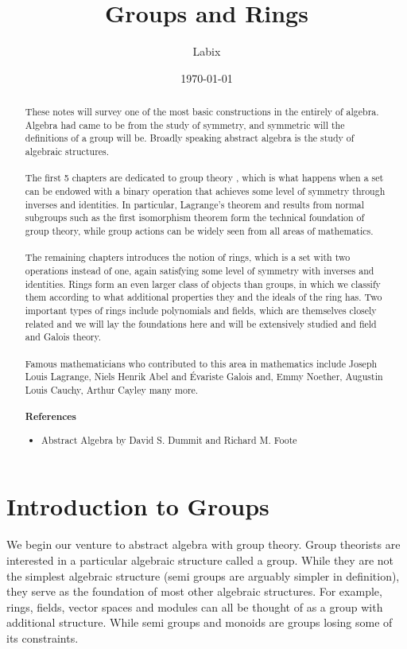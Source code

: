 \documentclass[a4paper]{article}
\title{Groups and Rings}
\author{Labix}
\date{\today}
\begin{document}
\maketitle
\begin{abstract}
These notes will survey one of the most basic constructions in the entirely of algebra. Algebra had came to be from the study of symmetry, and symmetric will the definitions of a group will be. Broadly speaking abstract algebra is the study of algebraic structures. \\~\\

The first 5 chapters are dedicated to group theory , which is what happens when a set can be endowed with a binary operation that achieves some level of symmetry through inverses and identities. In particular, Lagrange's theorem and results from normal subgroups such as the first isomorphism theorem form the technical foundation of group theory, while group actions can be widely seen from all areas of mathematics. \\~\\

The remaining chapters introduces the notion of rings, which is a set with two operations instead of one, again satisfying some level of symmetry with inverses and identities. Rings form an even larger class of objects than groups, in which we classify them according to what additional properties they and the ideals of the ring has. Two important types of rings include polynomials and fields, which are themselves closely related and we will lay the foundations here and will be extensively studied and field and Galois theory. \\~\\

Famous mathematicians who contributed to this area in mathematics include Joseph Louis Lagrange, Niels Henrik Abel and Évariste Galois and, Emmy Noether, Augustin Louis Cauchy, Arthur Cayley many more. \\~\\
\textbf{References}
\begin{itemize}
\item Abstract Algebra by David S. Dummit and Richard M. Foote
\end{itemize}
\end{abstract}
\pagebreak
\tableofcontents
\pagebreak

\section{Introduction to Groups}
We begin our venture to abstract algebra with group theory. Group theorists are interested in a particular algebraic structure called a group. While they are not the simplest algebraic structure (semi groups are arguably simpler in definition), they serve as the foundation of most other algebraic structures. For example, rings, fields, vector spaces and modules can all be thought of as a group with additional structure. While semi groups and monoids are groups losing some of its constraints. 
\end{document}
